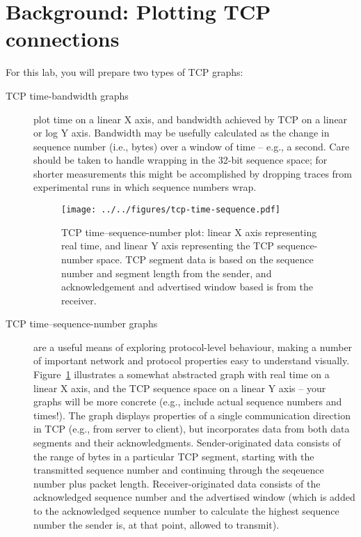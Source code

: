 \documentclass[a4paper,10pt]{article}
\begin{document}
\section*{Background: Plotting TCP connections}

For this lab, you will prepare two types of TCP graphs:

\begin{description}
\item[TCP time-bandwidth graphs] plot time on a linear X axis, and bandwidth
  achieved by TCP on a linear or log Y axis.
  Bandwidth may be usefully calculated as the change in sequence number (i.e.,
  bytes) over a window of time -- e.g., a second.
  Care should be taken to handle wrapping in the 32-bit sequence space; for
  shorter measurements this might be accomplished by dropping traces from
  experimental runs in which sequence numbers wrap.

\begin{figure}[t]
\begin{center}
  \texttt{[image: ../../figures/tcp-time-sequence.pdf]}
\end{center}
\caption{TCP time--sequence-number plot: linear X axis representing real time,
and linear Y axis representing the TCP sequence-number space.
TCP segment data is based on the sequence number and segment length from the
sender, and acknowledgement and advertised window based is from the receiver.}
\label{fig:tcp-time-sequence-number-graph}
\end{figure}

\item[TCP time--sequence-number graphs] are a useful means of exploring
  protocol-level behaviour, making a number of important network and protocol
  properties easy to understand visually.
  Figure~\ref{fig:tcp-time-sequence-number-graph} illustrates a somewhat
  abstracted graph with real time on a linear X axis, and the TCP sequence
  space on a linear Y axis -- your graphs will be more concrete (e.g., include
  actual sequence numbers and times!).
  The graph displays properties of a single communication direction in TCP
  (e.g., from server to client), but incorporates data from both data segments
  and their acknowledgments.
  Sender-originated data consists of the range of bytes in a particular TCP
  segment, starting with the transmitted sequence number and continuing
  through the seqeuence number plus packet length.
  Receiver-originated data consists of the acknowledged sequence number and
  the advertised window (which is added to the acknowledged sequence number
  to calculate the highest sequence number the sender is, at that point,
  allowed to transmit).
\end{description}
\end{document}
